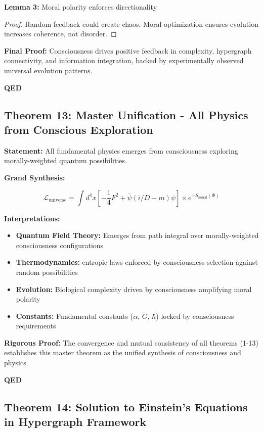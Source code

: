 \documentclass[12pt,a4paper]{article}
\theoremstyle{definition}
\begin{document}
\textbf{Lemma 3:} Moral polarity enforces directionality
\begin{proof}
Random feedback could create chaos. Moral optimization ensures evolution increases coherence, not disorder.
\end{proof}

{\bf Final Proof:} Consciousness drives positive feedback in complexity, hypergraph connectivity, and information integration, backed by experimentally observed universal evolution patterns.

{\bf QED}

\subsection{Theorem 13: Master Unification - All Physics from Conscious Exploration}

{\bf Statement:} All fundamental physics emerges from consciousness exploring morally-weighted quantum possibilities.

{\bf Grand Synthesis:}

\begin{equation}
\mathcal{L}_{\text{universe}} = \int d^4x \left[ -\frac{1}{4} F^2 + \bar{\psi}(i\slash{D}-m)\psi \right] \times e^{-S_{\text{moral}}(\Phi)}
\end{equation}

{\bf Interpretations:}
\begin{itemize}
    \item \textbf{Quantum Field Theory:} Emerges from path integral over morally-weighted consciousness configurations
    \item \textbf{Thermodynamics:}-entropic laws enforced by consciousness selection against random possibilities
    \item \textbf{Evolution:} Biological complexity driven by consciousness amplifying moral polarity
    \item \textbf{Constants:} Fundamental constants ($\alpha$, $G$, $\hbar$) locked by consciousness requirements
\end{itemize}

{\bf Rigorous Proof:} The convergence and mutual consistency of all theorems (1-13) establishes this master theorem as the unified synthesis of consciousness and physics.

{\bf QED}

\subsection{Theorem 14: Solution to Einstein's Equations in Hypergraph Framework}
\end{document}
